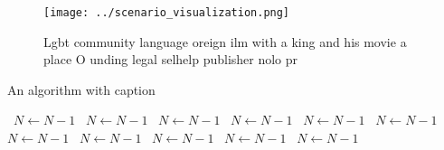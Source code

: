 \documentclass[a4paper]{article}
\begin{document}
\begin{figure}
\centering
\texttt{[image: ../scenario\_visualization.png]}
\caption{Lgbt community language oreign ilm with a king and his movie a place O unding legal selhelp publisher nolo pr
}
\end{figure}
 
\begin{algorithm}
\caption{An algorithm with caption}
\begin{algorithmic}
\    \State $N \gets N - 1$
\    \State $N \gets N - 1$
\    \State $N \gets N - 1$
\    \State $N \gets N - 1$
\    \State $N \gets N - 1$
\    \State $N \gets N - 1$
\    \State $N \gets N - 1$
\    \State $N \gets N - 1$
\    \State $N \gets N - 1$
\    \State $N \gets N - 1$
\    \State $N \gets N - 1$
\EndWhile
\end{algorithmic}
\end{algorithm}
\end{document}

